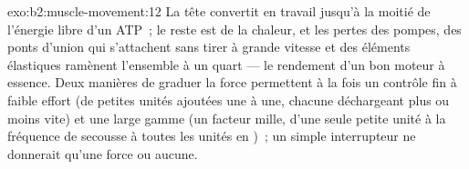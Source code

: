 \begin{solution}{exo:b2:muscle-movement:12}
La tête convertit en travail jusqu'à la moitié de l'énergie libre d'un
ATP~; le reste est de la chaleur, et les pertes des pompes, des ponts
d'union qui s'attachent sans tirer à grande vitesse et des éléments
élastiques ramènent l'ensemble à un quart --- le rendement d'un bon
moteur à essence. Deux manières de graduer la force permettent à la fois
un contrôle fin à faible effort (de petites unités ajoutées une à une,
chacune déchargeant plus ou moins vite) et une large gamme (un facteur
mille, d'une seule petite unité à la fréquence de secousse à toutes les
unités en )~; un simple interrupteur ne donnerait qu'une force ou
aucune.
\end{solution}

